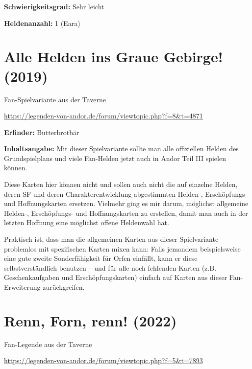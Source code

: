 {\textbf{Schwierigkeitsgrad:} Sehr leicht

\textbf{Heldenanzahl:} 1 (Eara)






\newpage
{}
\section{Alle Helden ins Graue Gebirge! (2019)}

\begin{center}
    Fan-Spielvariante aus der Taverne

    \url{https://legenden-von-andor.de/forum/viewtopic.php?f=8&t=4871}
\end{center}



\textbf{Erfinder:} Butterbrotbär

\textbf{Inhaltsangabe:} Mit dieser Spielvariante sollte man alle offiziellen Helden des Grundspielplans und viele Fan-Helden jetzt auch in Andor Teil III spielen können.

Diese Karten hier können nicht und sollen auch nicht die auf einzelne Helden, deren SF und deren Charakterentwicklung abgestimmten Helden-, Erschöpfungs- und Hoffnungskarten ersetzen. Vielmehr ging es mir darum, möglichst allgemeine Helden-, Erschöpfungs- und Hoffnungskarten zu erstellen, damit man auch in der letzten Hoffnung eine möglichst offene Heldenwahl hat.

Praktisch ist, dass man die allgemeinen Karten aus dieser Spielvariante problemlos mit spezifischen Karten mixen kann: Falls jemandem beispielsweise eine gute zweite Sonderfähigkeit für Orfen einfällt, kann er diese selbstverständlich benutzen – und für alle noch fehlenden Karten (z.B. Geschenkaufgaben und Erschöpfungskarten) einfach auf Karten aus dieser Fan-Erweiterung zurückgreifen.






\newpage
{}
\section{Renn, Forn, renn! (2022)}

\begin{center}
    Fan-Legende aus der Taverne

    \url{https://legenden-von-andor.de/forum/viewtopic.php?f=5&t=7893}
\end{center}

}
